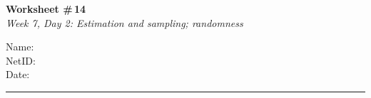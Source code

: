 \documentclass[11pt]{article}
\begin{document}
\noindent
\begin{minipage}[t]{0.55\textwidth}
  \vspace{0pt}
  {\LARGE \textbf{Worksheet \#\,14}} \\[0.3em]
  {\large \textit{Week 7, Day 2: Estimation and sampling; randomness}}
\end{minipage}
\hfill
\begin{minipage}[t]{0.40\textwidth}
  \vspace{0pt}
  \begin{mdframed}[linecolor=black, linewidth=1pt, innertopmargin=10pt, innerbottommargin=10pt]
    \small
    \vspace{0.4cm}
    Name: \underline{\hspace{4.5cm}} \\[1em]
    NetID: \underline{\hspace{4.3cm}} \\[1em]
    Date: \underline{\hspace{4.4cm}} \\
  \end{mdframed}
\end{minipage}

\vspace{1em}
\noindent\rule{\linewidth}{1pt}
\vspace{0.2em}
\end{document}
